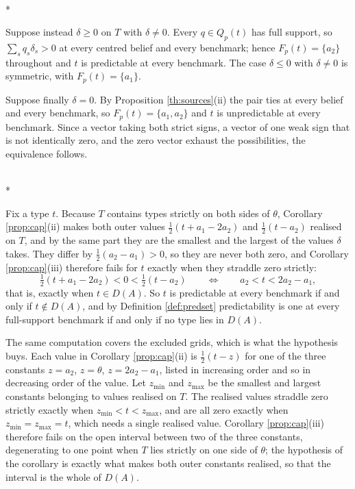 \documentclass[12pt]{article}
\makeatletter
\theoremstyle{definition}
\renewenvironment{proof}[1][\proofname]{\par
  \pushQED{\qed}%
  \normalfont \topsep6\p@\@plus6\p@\relax
  \trivlist
  \item[\hskip\labelsep\itshape #1\@addpunct{.}]\mbox{}\\*
  \ignorespaces
}{%
  \popQED\endtrivlist\@endpefalse
}
\makeatother
\begin{document}
\begin{proof}[Proof of Corollary \ref{prop:cap}]
Suppose instead $\delta \ge 0$ on $T$ with $\delta \neq 0$. Every $q \in Q_p(t)$ has full support, so $\sum_s q_s \delta_s > 0$ at every centred belief and every benchmark; hence $F_p(t) = \{a_2\}$ throughout and $t$ is predictable at every benchmark. The case $\delta \le 0$ with $\delta \neq 0$ is symmetric, with $F_p(t) = \{a_1\}$.

Suppose finally $\delta = 0$. By Proposition \ref{th:sources}(ii) the pair ties at every belief and every benchmark, so $F_p(t) = \{a_1, a_2\}$ and $t$ is unpredictable at every benchmark. Since a vector taking both strict signs, a vector of one weak sign that is not identically zero, and the zero vector exhaust the possibilities, the equivalence follows.
\end{proof}

\begin{proof}[Proof of Corollary \ref{cor:deadzone}]
Fix a type $t$. Because $T$ contains types strictly on both sides of $\theta$, Corollary \ref{prop:cap}(ii) makes both outer values $\tfrac12 (t + a_1 - 2a_2)$ and $\tfrac12 (t - a_2)$ realised on $T$, and by the same part they are the smallest and the largest of the values $\delta$ takes. They differ by $\tfrac12 (a_2 - a_1) > 0$, so they are never both zero, and Corollary \ref{prop:cap}(iii) therefore fails for $t$ exactly when they straddle zero strictly:
\[
\tfrac12 (t + a_1 - 2a_2) < 0 < \tfrac12 (t - a_2)
\qquad\Longleftrightarrow\qquad
a_2 < t < 2a_2 - a_1 ,
\]
that is, exactly when $t \in D(A)$. So $t$ is predictable at every benchmark if and only if $t \notin D(A)$, and by Definition \ref{def:predset} predictability is one at every full-support benchmark if and only if no type lies in $D(A)$.

The same computation covers the excluded grids, which is what the hypothesis buys. Each value in Corollary \ref{prop:cap}(ii) is $\tfrac12 (t - z)$ for one of the three constants $z = a_2$, $z = \theta$, $z = 2a_2 - a_1$, listed in increasing order and so in decreasing order of the value. Let $z_{\min}$ and $z_{\max}$ be the smallest and largest constants belonging to values realised on $T$. The realised values straddle zero strictly exactly when $z_{\min} < t < z_{\max}$, and are all zero exactly when $z_{\min} = z_{\max} = t$, which needs a single realised value. Corollary \ref{prop:cap}(iii) therefore fails on the open interval between two of the three constants, degenerating to one point when $T$ lies strictly on one side of $\theta$; the hypothesis of the corollary is exactly what makes both outer constants realised, so that the interval is the whole of $D(A)$.
\end{proof}
\end{document}
